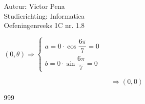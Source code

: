 \documentclass[a4paper]{article}
\begin{document}
	
\noindent \large Auteur: Victor Pena \\
\noindent \large Studierichting: Informatica\\
\noindent \large Oefeningenreeks 1C nr. 1.8\\
	
\medskip
	
\normalsize
	
$\left(0,\theta\right) \Rightarrow 
\left\{\begin{array}{l}
	a = 0\cdot\cos\dfrac{6\pi}{7} = 0\\
	b = 0\cdot\sin\dfrac{6\pi}{7} = 0
\end{array}\right.$

$$\Rightarrow\left(0,0\right)$$
	
\begin{thebibliography}{999}
\end{thebibliography}
\end{document}
